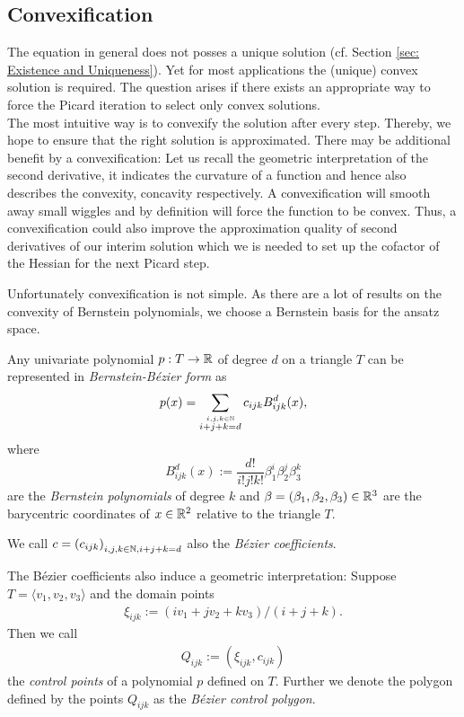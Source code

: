 \subsection{Convexification} \label{subsec: convexification}
 The \MA equation in general does not posses a unique solution (cf. Section \ref{sec: Existence and Uniqueness}). Yet for most applications the (unique) convex solution is required. The question arises if there exists an appropriate way to force the Picard iteration to select only convex solutions.\\
The most intuitive way is to convexify the solution after every step. Thereby, we hope to ensure that the right solution is approximated. There may be additional benefit by a convexification:
Let us recall the geometric interpretation of the second derivative, it indicates the curvature of a function and hence also describes the convexity, concavity respectively. A convexification will smooth away small wiggles and by definition will force the function to be convex.  Thus, a convexification could also improve the approximation quality of second derivatives of our interim solution which we is needed to set up the cofactor of the Hessian for the next Picard step. %

Unfortunately convexification is not simple. As there are a lot of results on the convexity of Bernstein polynomials, we choose a Bernstein basis for the ansatz space.
\begin{definition}\label{def: BernsteinBezierForm}
	Any univariate polynomial $p:T \rightarrow \mathbb{R}$ of degree $d$ on a triangle $T$ can be represented in \emph{Bernstein-B\'ezier form} as
\begin{align}
	p(x) = \sum_{\stackrel{i,j,k \in \mathbb{N}}{i+j+k = d}}  c_{ijk} B^d_{ijk}(x),\label{eq: BernsteinBezierForm}
\end{align}
where
\[
	B^d_{ijk}(x) := \frac {d!}{i!j!k!} \beta_1^i \beta_2^j \beta_3^k
\]
are the \emph{Bernstein polynomials} of degree $k$ and $\beta = (\beta_1, \beta_2, \beta_3)\in \mathbb{R}^3$ are the barycentric coordinates of $x \in \mathbb{R}^2$ relative to the triangle $T$.

We call $c=\left(c_{ijk}\right)_{i,j,k \in \mathbb{N}, i+j+k=d}$ also the \emph{B\'ezier coefficients}.
\end{definition}

The B\'ezier coefficients also induce a geometric interpretation: Suppose $T=\langle v_1, v_2, v_3 \rangle$ and the domain points
\begin{align}
	\xi_{ijk} := (i v_1+jv_2 + k v_3) / (i+j+k). \label{eq: domain points}
\end{align} 
Then we call 
\begin{align}
	Q_{ijk} := (\xi_{ijk}, c_{ijk}) \label{eq: control points}
\end{align} the \emph{control points} of a polynomial $p$ defined on $T$. Further we denote the polygon defined by the points $Q_{ijk}$ as the \emph{B\'ezier control polygon}.

